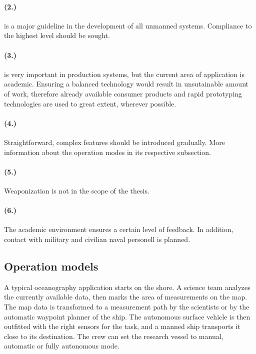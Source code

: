 \paragraph{(2.)} is a major guideline in the development of all unmanned systems. Compliance to the highest level should be sought.

\paragraph{(3.)} is very important in production systems, but the current area of application is academic. Ensuring a balanced technology would result in unsutainable amount of work, therefore already available consumer products and rapid prototyping technologies are used to great extent, wherever possible.

\paragraph{(4.)} Straightforward, complex features should be introduced gradually. More information about the operation modes in its respective subsection.

\paragraph{(5.)} Weaponization is not in the scope of the thesis.

\paragraph{(6.)} The academic environment ensures a certain level of feedback. In addition, contact with military and civilian naval personell is planned.

\subsection*{Operation models}

A typical oceanography application starts on the shore. A science team analyzes the currently available data, then marks the area of measurements on the map. The  map data is transformed to a measurement path by the scientists or by the automatic waypoint planner of the ship. The autonomous surface vehicle is then outfitted with the right sensors for the task, and a manned ship transports it close to its destination. The crew can set the research vessel to manual, automatic or fully autonomous mode.

